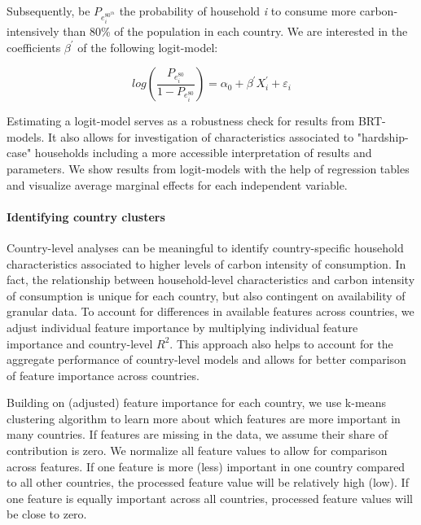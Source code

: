 \documentclass[12pt, a4paper]{article}
\begin{document}
Subsequently, be $P_{e_{i}^{80^{th}}}$ the probability of household \textit{i} to consume more carbon-intensively than 80\% of the population in each country. We are interested in the coefficients $\beta^{'}$ of the following logit-model:

\begin{equation}
    log \left( \frac{P_{e_{i}^{80}}}{1 - P_{e_{i}^{80}}} \right) = \alpha_{0} + \beta^{'} X_{i}^{'} + \varepsilon_{i}
\end{equation}

Estimating a logit-model serves as a robustness check for results from BRT-models. It also allows for investigation of characteristics associated to "hardship-case" households including a more accessible interpretation of results and parameters. We show results from logit-models with the help of regression tables and visualize average marginal effects for each independent variable.

\paragraph{Identifying country clusters} Country-level analyses can be meaningful to identify country-specific household characteristics associated to higher levels of carbon intensity of consumption. In fact, the relationship between household-level characteristics and carbon intensity of consumption is unique for each country, but also contingent on availability of granular data. To account for differences in available features across countries, we adjust individual feature importance by multiplying individual feature importance and country-level $R^{2}$. This approach also helps to account for the aggregate performance of country-level models and allows for better comparison of feature importance across countries.

Building on (adjusted) feature importance for each country, we use k-means clustering algorithm to learn more about which features are more important in many countries. If features are missing in the data, we assume their share of contribution is zero. We normalize all feature values to allow for comparison across features. If one feature is more (less) important in one country compared to all other countries, the processed feature value will be relatively high (low). If one feature is equally important across all countries, processed feature values will be close to zero.
\end{document}
